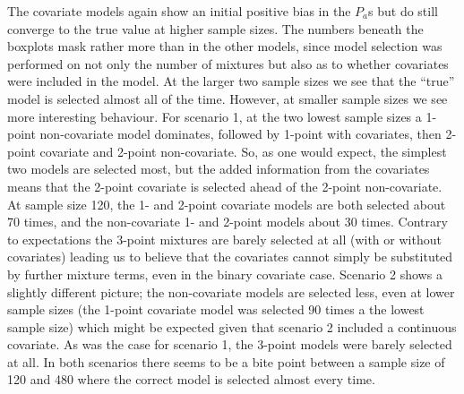 \documentclass[useAMS,referee, usegraphicx]{biom}
\begin{document}
The covariate models again show an initial positive bias in the $P_a$s but do still converge to the true value at higher sample sizes. The numbers beneath the boxplots mask rather more than in the other models, since model selection was performed on not only the number of mixtures but also as to whether covariates were included in the model. At the larger two sample sizes we see that the ``true'' model is selected almost all of the time. However,  at smaller sample sizes we see more interesting behaviour. For scenario 1, at the two lowest sample sizes a 1-point non-covariate model dominates, followed by 1-point with covariates, then 2-point covariate and 2-point non-covariate. So, as one would expect, the simplest two models are selected most, but the added information from the covariates means that the 2-point covariate is selected ahead of the 2-point non-covariate. At sample size 120, the 1- and 2-point covariate models are both selected about 70 times, and the non-covariate 1- and 2-point models about 30 times. Contrary to expectations the 3-point mixtures are barely selected at all (with or without covariates) leading us to believe that the covariates cannot simply be substituted by further mixture terms, even in the binary covariate case. Scenario 2 shows a slightly different picture; the non-covariate models are selected less, even at lower sample sizes (the 1-point covariate model was selected 90 times a the lowest sample size) which might be expected given that scenario 2 included a continuous covariate. As was the case for scenario 1, the 3-point models were barely selected at all. In both scenarios there seems to be a bite point between a sample size of 120 and 480 where the correct model is selected almost every time.
	
\end{document}
